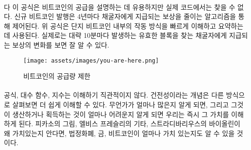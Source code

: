 \paragraph{}
\begin{comment}	
	While this formula is useful to describe Bitcoin's supply, it is actually
	nowhere to be found in the code. Issuance of new bitcoin is done in an
	algorithmically controlled fashion, by reducing the reward which is paid to
	miners every four years~\cite{btcwiki:supply}. The formula above is used to
	quickly sum up what is happening under the hood. What really happens can be best
	seen by looking at the change in block reward, the reward paid out to whoever
	finds a valid block, which roughly happens every 10 minutes.
\end{comment}다
이 공식은 비트코인의 공급을 설명하는 데 유용하지만 실제 코드에서는 찾을 수 없다. 
신규 비트코인 발행은 4년마다 채굴자에게 지급되는 보상을 줄이는 알고리즘을 통해 제어된다.\cite{btcwiki:supply}
위 공식은 단지 비트코인 내부의 작동 방식을 빠르게 이해하고 요약하는 데 사용된다. 
실제로는 대략 10분마다 발생하는 유효한 블록을 찾는 채굴자에게 지급되는 보상의 변화를 보면 잘 알 수 있다.

\begin{figure}
	\texttt{[image: assets/images/you-are-here.png]}
	\caption{비트코인의 공급량 제한}
	\label{fig:you-are-here.png}
\end{figure}

\paragraph{}
\begin{comment}	
	Formulas, logarithmic functions and exponentials are not exactly
	intuitive to understand. The concept of \textit{soundness} might be easier to
	understand if looked at in another way. Once we know how much there is
	of something, and once we know how hard this something is to produce or
	get our hands on, we immediately understand its value. What is true for
	Picasso's paintings, Elvis Presley's guitars, and Stradivarius violins
	is also true for fiat currency, gold, and bitcoins.
\end{comment}
공식, 대수 함수, 지수는 이해하기 직관적이지 않다. 
건전성이라는 개념은 다른 방식으로 살펴보면 더 쉽게 이해할 수 있다.
무언가가 얼마나 많은지 알게 되면, 그리고 그것이 생산하거나 획득하는 것이 얼마나 어려운지 알게 되면 
우리는 즉시 그 가치를 이해하게 된다. 
피카소의 그림, 엘비스 프레슬리의 기타, 스트라디바리우스의 바이올린이 왜 가치있는지 안다면,
법정화폐, 금, 비트코인이 얼마나 가치 있는지도 알 수 있을 것이다.

